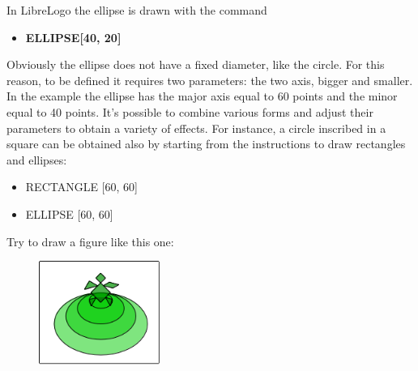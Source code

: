 In LibreLogo the ellipse is drawn with the command

\vskip 1cm

\begin{scriptsize}
\begin{minipage}{0.40\textwidth}
\begin{itemize}[itemsep=-3pt,parsep=2pt]
\item[] \textbf{ELLIPSE[40, 20]}
\end{itemize}
\end{minipage}
\end{scriptsize}

\vskip 1cm

Obviously the ellipse does not have a fixed diameter, like the circle. For this reason, to be defined it requires two parameters: the two axis, bigger and smaller. In the example the ellipse has the major axis equal to 60 points and the minor equal to 40 points. It's possible to combine various forms and adjust their parameters to obtain a variety of effects. For instance, a circle inscribed in a square can be obtained also by starting from the instructions to draw rectangles and ellipses:

\vskip 1cm

\begin{scriptsize}
\begin{minipage}{0.40\textwidth}
\begin{itemize}[itemsep=-3pt,parsep=2pt]
\item[] RECTANGLE [60, 60] 
\item[] ELLIPSE [60, 60]   
\end{itemize}
\end{minipage}
\end{scriptsize}

\vskip 1cm

Try to draw a figure like this one:

\vskip 1cm

\begin{figure}[H]
   \centering
   \includegraphics[width=4.0cm,trim=4 4 8 4,clip]{./images/disegnare/disegnare-24.png}
   \label{dis-23}
\end{figure}

